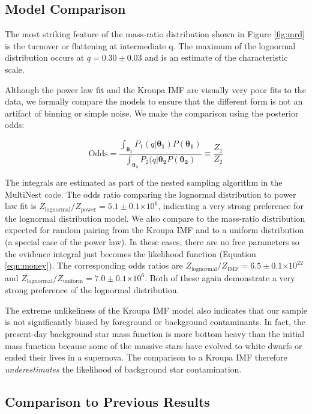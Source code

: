 \documentclass{emulateapj}
\providecommand{\e}[1]{\ensuremath{\times 10^{#1}}}
\renewcommand{\vec}[1]{\bm{#1}}
\begin{document}
\subsection{Model Comparison}

The most striking feature of the mass-ratio distribution shown in Figure \ref{fig:mrd} is the turnover or flattening at intermediate q. The maximum of the lognormal distribution occurs at $q = 0.30 \pm 0.03$ and is an estimate of the characteristic scale.

Although the power law fit and the Kroupa IMF are visually very poor fits to the data, we formally compare the models to ensure that the different form is not an artifact of binning or simple noise. We make the comparison using the posterior odds:

\begin{equation}
\mathrm{Odds} = \frac{\int_{\vec{\theta_1}} P_1(q|\vec{\theta_1}) P(\vec{\theta_1})}{\int_{\vec{\theta_2}} P_2(q|\vec{\theta_2}  P(\vec{\theta_2})} \equiv \frac{Z_1}{Z_2}
\end{equation}

The integrals are estimated as part of the nested sampling algorithm in the MultiNest code. The odds ratio comparing the lognormal distribution to power law fit is $Z_\mathrm{lognormal} / Z_\mathrm{power} = 5.1 \pm 0.1 \e{6}$, indicating a very strong preference for the lognormal distribution model. We also compare to the mass-ratio distribution expected for random pairing from the Kroupa IMF and to a uniform distribution (a special case of the power law). In these cases, there are no free parameters so the evidence integral just becomes the likelihood function (Equation \ref{eqn:money}). The corresponding odds ratios are  $Z_\mathrm{lognormal} / Z_\mathrm{IMF} = 6.5 \pm 0.1 \e{22}$ and $Z_\mathrm{lognormal} / Z_\mathrm{uniform} = 7.0 \pm 0.1 \e{6}$. Both of these again demonstrate a very strong preference of the lognormal distribution. 

The extreme unlikeliness of the Kroupa IMF model also indicates that our sample is not significantly biased by foreground or background contaminants. In fact, the present-day background star mass function is more bottom heavy than the initial mass function because some of the massive stars have evolved to white dwarfs or ended their lives in a supernova. The comparison to a Kroupa IMF therefore \emph{underestimates} the likelihood of background star contamination.


\subsection{Comparison to Previous Results}
\end{document}
